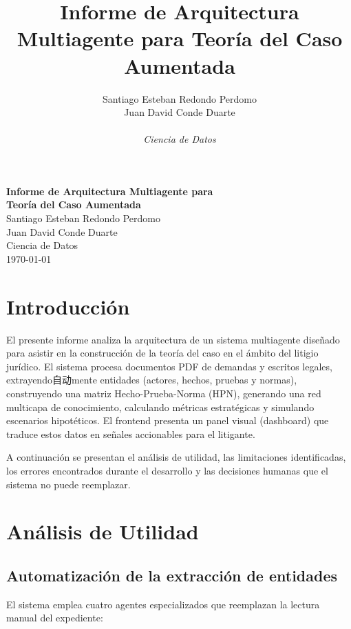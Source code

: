 \documentclass[12pt, letterpaper]{article}
\title{\textbf{Informe de Arquitectura Multiagente para Teoría del Caso Aumentada}}
\author{
  Santiago Esteban Redondo Perdomo \\
  Juan David Conde Duarte \\
  \\
  \textit{Ciencia de Datos}
}
\date{}
\begin{document}
\thispagestyle{empty}
\begin{center}
  \vspace*{2cm}
  {\LARGE\bfseries Informe de Arquitectura Multiagente para \\[6pt]
  Teoría del Caso Aumentada}\\[2cm]
  {\large Santiago Esteban Redondo Perdomo \\[4pt]
  Juan David Conde Duarte}\\[1.5cm]
  {\large Ciencia de Datos}\\[1cm]
  {\large \today}\\[1cm]
  \vfill
\end{center}
\newpage


\section{Introducción}

El presente informe analiza la arquitectura de un sistema multiagente
diseñado para asistir en la construcción de la teoría del caso en el
ámbito del litigio jurídico. El sistema procesa documentos PDF de
demandas y escritos legales, extrayendo自动mente entidades
(actores, hechos, pruebas y normas), construyendo una matriz
Hecho-Prueba-Norma (HPN), generando una red multicapa de conocimiento,
calculando métricas estratégicas y simulando escenarios hipotéticos.
El frontend presenta un panel visual (dashboard) que traduce estos
datos en señales accionables para el litigante.

A continuación se presentan el análisis de utilidad, las limitaciones
identificadas, los errores encontrados durante el desarrollo y las
decisiones humanas que el sistema no puede reemplazar.

\section{Análisis de Utilidad}

\subsection{Automatización de la extracción de entidades}

El sistema emplea cuatro agentes especializados que reemplazan la
lectura manual del expediente:
\end{document}
